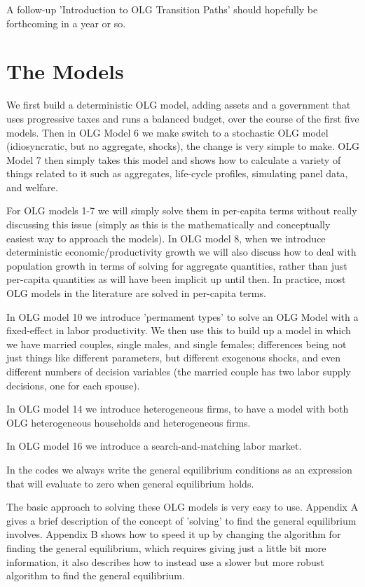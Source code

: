 \documentclass[11pt]{article}%
\begin{document}
A follow-up 'Introduction to OLG Transition Paths' should hopefully be forthcoming in a year or so.

\newpage
\section{The Models}
We first build a deterministic OLG model, adding assets and a government that uses progressive taxes and runs a balanced budget, over the course of the first five models. Then in OLG Model 6 we make switch to a stochastic OLG model (idiosyncratic, but no aggregate, shocks), the change is very simple to make. OLG Model 7 then simply takes this model and shows how to calculate a variety of things related to it such as aggregates, life-cycle profiles, simulating panel data, and welfare.

For OLG models 1-7 we will simply solve them in per-capita terms without really discussing this issue (simply as this is the mathematically and conceptually easiest way to approach the models). In OLG model 8, when we introduce deterministic economic/productivity growth we will also discuss how to deal with population growth in terms of solving for aggregate quantities, rather than just per-capita quantities as will have been implicit up until then. In practice, most OLG models in the literature are solved in per-capita terms.

In OLG model 10 we introduce 'permament types' to solve an OLG Model with a fixed-effect in labor productivity. We then use this to build up a model in which we have married couples, single males, and single females; differences being not just things like different parameters, but different exogenous shocks, and even different numbers of decision variables (the married couple has two labor supply decisions, one for each spouse).

In OLG model 14 we introduce heterogeneous firms, to have a model with both OLG heterogeneous households and heterogeneous firms.

In OLG model 16 we introduce a search-and-matching labor market.

In the codes we always write the general equilibrium conditions as an expression that will evaluate to zero when general equilibrium holds.

The basic approach to solving these OLG models is very easy to use. Appendix A gives a brief description of the concept of 'solving' to find the general equilibrium involves. Appendix B shows how to speed it up by changing the algorithm for finding the general equilibrium, which requires giving just a little bit more information, it also describes how to instead use a slower but more robust algorithm to find the general equilibrium.
\end{document}
